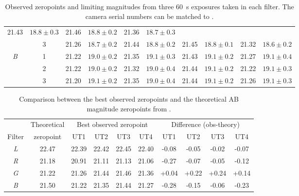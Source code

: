 \begin{colsection}
\begin{colsection}
\begin{table}[p]
\begin{center}
\begin{tabular}{cc|cc|cc|cc|cc}
            21.43 & $18.8 \pm 0.3$ &
            21.46 & $18.8 \pm 0.2$ &
            21.36 & $18.7 \pm 0.3$
            \\
            & 3 &
            21.26 & $18.7 \pm 0.2$ &
            21.44 & $18.8 \pm 0.2$ &
            21.45 & $18.8 \pm 0.1$ &
            21.32 & $18.6 \pm 0.2$
            \\
            \midrule
            \textit{B} & 1 &
            21.22 & $19.0 \pm 0.2$ &
            21.35 & $19.1 \pm 0.3$ &
            21.43 & $19.1 \pm 0.2$ &
            21.27 & $19.1 \pm 0.4$
            \\
            & 2 &
            21.22 & $19.0 \pm 0.2$ &
            21.32 & $19.0 \pm 0.4$ &
            21.44 & $19.1 \pm 0.2$ &
            21.22 & $19.1 \pm 0.3$
            \\
            & 3 &
            21.20 & $19.1 \pm 0.2$ &
            21.35 & $19.0 \pm 0.4$ &
            21.44 & $19.1 \pm 0.2$ &
            21.26 & $19.1 \pm 0.3$
            \\
        \end{tabular}
    \end{center}
    \caption[Observed zeropoints and limiting magnitudes]{
        Observed zeropoints and limiting magnitudes from three \SI{60}{\second} exposures taken in each filter. The camera serial numbers can be matched to .
    }\label{tab:zps_lms}
\end{table}

\begin{table}[p]
    \begin{center}
        \begin{tabular}{c|c|cccc|cccc} %
             &
            Theoretical &
            \multicolumn{4}{c|}{Best observed zeropoint} &
            \multicolumn{4}{c}{Difference (obs-theory)}
            \\
            Filter & zeropoint & UT1 & UT2 & UT3 & UT4 & UT1 & UT2 & UT3 & UT4 \\
            \midrule
            \textit{L} & 22.47 & 22.39 & 22.42 & 22.45 & 22.40 & -0.08 & -0.05 & -0.02 & -0.07 \\
            \textit{R} & 21.18 & 20.91 & 21.11 & 21.13 & 21.06 & -0.27 & -0.07 & -0.05 & -0.12 \\
            \textit{G} & 21.22 & 21.26 & 21.44 & 21.46 & 21.36 & +0.04 & +0.22 & +0.24 & +0.14 \\
            \textit{B} & 21.50 & 21.22 & 21.35 & 21.44 & 21.27 & -0.28 & -0.15 & -0.06 & -0.23 \\
        \end{tabular}
    \end{center}
    \caption[Comparison between theoretical and observed zeropoints]{
        Comparison between the best observed zeropoints and the theoretical AB magnitude zeropoints from .
    }\label{tab:zps_comparison}
\end{table}


\end{colsection}
\end{colsection}
